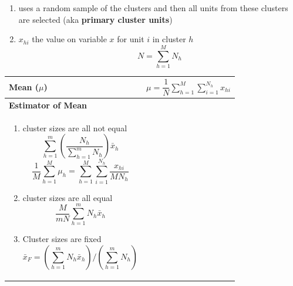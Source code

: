 \begin{enumerate}
    \item uses a random sample of the clusters and then all units from these clusters are selected (aka \textbf{primary cluster units})

    \item $x_{hi}$ the value on variable $x$ for unit $i$ in cluster $h$
    \[
        N = \displaystyle\sum_{h=1}^{M} N_h
    \]

    
\end{enumerate}

\begin{longtable}{|p{5cm}|p{9cm}|}
    \hline\endfirsthead
    \hline\endhead
    \hline\endfoot
    \hline\endlastfoot

    \textbf{Mean ($\mu$)} & $
        \mu = \dfrac{1}{N}
        \displaystyle\sum_{h=1}^{M}
        \displaystyle\sum_{i=1}^{N_h}
        x_{hi}
    $\\[1ex]
    \hline

    \textbf{Estimator of Mean} & \begin{minipage}{8cm}
        \vspace{0.1cm}
        $
            \bar{x}_h = \mu_h
            \quad\quad
            \bar{x} = \dfrac{1}{m}
            \displaystyle\sum_{h=1}^{m} \bar{x}_h
        $\\
        \begin{enumerate}
            \item cluster sizes are all not equal
            \[
                \displaystyle
                \sum_{h=1}^{m}
                \left(
                    \frac{N_h}{
                        \sum_{h=1}^{m} N_h
                    }
                \right)\bar{x}_h
            \]
            \[
                \dfrac{1}{M}\displaystyle\sum_{h=1}^{M}\mu_h
                =
                \displaystyle\sum_{h=1}^{M}
                \displaystyle\sum_{i=1}^{N_h}
                \dfrac{x_{hi}}{MN_h}
            \]

            \item cluster sizes are all equal
            \[
                \dfrac{M}{mN}
                \displaystyle\sum_{h=1}^{m} N_h\bar{x}_h
            \]

            \item Cluster sizes are fixed
            \[
                \bar{x}_F =
                \left( 
                    \displaystyle\sum_{h=1}^{m} N_h\bar{x}_h
                \right) / \left( 
                    \displaystyle\sum_{h=1}^{m} N_h
                \right)
            \]


\end{enumerate}
\end{minipage}
\end{longtable}
